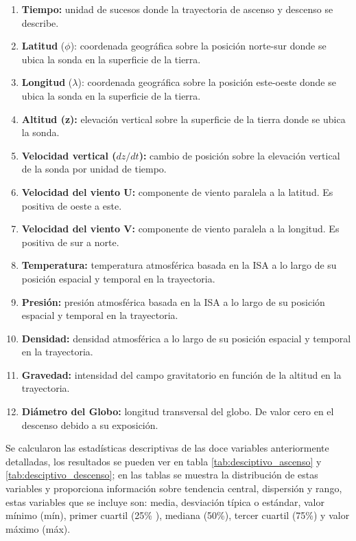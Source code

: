 \begin{enumerate}
    \item \textbf{Tiempo:} unidad de sucesos donde la trayectoria de ascenso y descenso se describe. 
    \item \textbf{Latitud} ($\phi$): coordenada geográfica sobre la posición norte-sur donde se ubica la sonda en la superficie de la tierra. 
    \item 	 \textbf{Longitud} ($\lambda$): coordenada geográfica sobre la posición este-oeste donde se ubica la sonda en la superficie de la tierra. 
    \item 	\textbf{Altitud (z):} elevación vertical sobre la superficie de la tierra donde se ubica la sonda.
    \item 	\textbf{Velocidad vertical ($dz/dt$):} cambio de posición sobre la elevación vertical de la sonda por unidad de tiempo.
    \item   \textbf{Velocidad del viento U:} componente de viento paralela a la latitud. Es positiva de oeste a este. 
    \item 	\textbf{Velocidad del viento V:}  componente de viento paralela a la longitud. Es positiva de sur a norte.
    \item 	\textbf{Temperatura:} temperatura atmosférica basada en la ISA a lo largo de su posición espacial y temporal en la trayectoria.
    \item   \textbf{Presión:} presión atmosférica basada en la ISA a lo largo de su posición espacial y temporal en la trayectoria.
    \item	\textbf{Densidad:} densidad atmosférica a lo largo de su posición espacial y temporal en la trayectoria.
    \item 	\textbf{Gravedad:} intensidad del campo gravitatorio en función de la altitud en la trayectoria.
    \item  \textbf{Diámetro del Globo:} longitud transversal del globo. De valor cero en el descenso debido a su exposición.
\end{enumerate}

\vspace{0.6 cm}

Se calcularon las estadísticas descriptivas de las doce variables anteriormente detalladas, los  resultados se pueden ver  en tabla \ref{tab:desciptivo_ascenso} y \ref{tab:desciptivo_descenso}; en las tablas se muestra la distribución de estas variables y proporciona información sobre tendencia central, dispersión y rango, estas variables que se incluye son:  media, desviación típica o estándar,  valor mínimo (mín), primer cuartil (25\% ), mediana (50\%), tercer cuartil (75\%) y valor máximo (máx).

